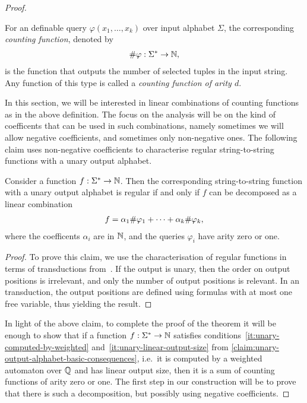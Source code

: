 \begin{proof}
\begin{definition}
       For an \mso definable query $\varphi(x_1,\ldots,x_k)$ over input alphabet $\Sigma$, the corresponding \emph{counting function}, denoted by
    \begin{align*}
    \#{\varphi} : \Sigma^* \to {\mathbb N},
    \end{align*}
    is the function that outputs the number of selected tuples in the input string. Any function of this type is called a \emph{\mso counting function of arity $d$}.
\end{definition}

In this section, we will be interested in linear combinations of counting functions as in the above definition. The focus on the analysis will be on the kind of coefficents that can be used in such combinations, namely sometimes we will allow negative coefficients, and sometimes only non-negative ones. The following claim uses non-negative coefficients to characterise  regular string-to-string  functions with a unary output alphabet.
    \begin{claim}\label{claim:mso-counting-regular}
        Consider a function $f : \Sigma^* \to {\mathbb N}$. Then the corresponding string-to-string function with a unary output alphabet is regular if and only if $f$  can be decomposed as  a linear combination 
        \begin{align*}
        f = \alpha_1 \#{\varphi_1} + \cdots +  \alpha_k \#{\varphi_k},
        \end{align*}        
        where the coefficents $\alpha_i$ are in ${\mathbb N}$, and the queries $\varphi_i$ have arity zero or one.
    \end{claim}
    \begin{proof}
        To prove this claim, we use the characterisation of regular functions in terms of \mso transductions from~\cite[Section 4]{engelfrietMSODefinableString2001}. If the output is unary, then the order on output positions is irrelevant, and only the number of output positions is relevant. In an \mso transduction, the output positions are defined using \mso formulas with at most one free variable, thus yielding the result. 
    \end{proof}

In light of the above claim, to complete the proof of the theorem it will be enough to show that if a function $f : \Sigma^* \to {\mathbb N}$ satisfies conditions~\ref{it:unary-computed-by-weighted} and~\ref{it:unary-linear-output-size} from \cref{claim:unary-output-alphabet-basic-consequences}, i.e.~it is computed by a weighted automaton over ${\mathbb Q}$ and has linear output size, then it is a sum of \mso counting functions of arity zero or one. The first step in our construction will be to prove that there is such a decomposition, but possibly using negative coefficients.


\end{proof}
